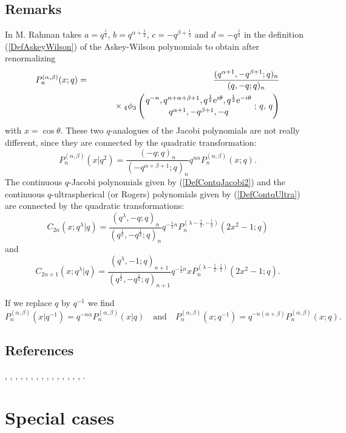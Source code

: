 \documentclass[envcountchap,graybox]{svmono}
\newcommand{\qhyp}[5]{\mbox{}_{#1}{\phi}_{#2}
\left(\genfrac{}{}{0pt}{}{#3}{#4}\,;\,q,\,#5\right)}
\newcommand{\mathindent}{\hspace{7.5mm}}
\newcommand{\e}{\textrm{e}}
\begin{document}
\subsection*{Remarks} 
In \cite{Rahman81IV} M. Rahman takes
$a=q^{\frac{1}{2}}$, $b=q^{\alpha+\frac{1}{2}}$, $c=-q^{\beta+\frac{1}{2}}$ and
$d=-q^{\frac{1}{2}}$ in the definition (\ref{DefAskeyWilson}) of the
Askey-Wilson polynomials to obtain after renormalizing
\begin{eqnarray}
\label{DefContqJacobi2}
P_n^{(\alpha,\beta)}(x;q)&=&\frac{(q^{\alpha+1},-q^{\beta+1};q)_n}{(q,-q;q)_n}\nonumber\\
& &{}\mathindent{}\times
\qhyp{4}{3}{q^{-n},q^{n+\alpha+\beta+1},q^{\frac{1}{2}}\e^{i\theta},q^{\frac{1}{2}}\e^{-i\theta}}
{q^{\alpha+1},-q^{\beta+1},-q}{q}
\end{eqnarray}
with $x=\cos\theta$. These two $q$-analogues of the Jacobi polynomials are not really
different, since they are connected by the quadratic transformation:
$$P_n^{(\alpha,\beta)}(x|q^2)=\frac{(-q;q)_n}{(-q^{\alpha+\beta+1};q)_n}q^{n\alpha}P_n^{(\alpha,\beta)}(x;q).$$
The continuous $q$-Jacobi polynomials given by (\ref{DefContqJacobi2}) and
the continuous $q$-ultra\-spher\-ical (or Rogers) polynomials given by
(\ref{DefContqUltra}) are connected by the quadratic transformations:
$$C_{2n}(x;q^{\lambda}|q)=\frac{(q^{\lambda},-q;q)_n}
{(q^{\frac{1}{2}},-q^{\frac{1}{2}};q)_n}q^{-\frac{1}{2}n}
P_n^{(\lambda-\frac{1}{2},-\frac{1}{2})}(2x^2-1;q)$$
and
$$C_{2n+1}(x;q^{\lambda}|q)=\frac{(q^{\lambda},-1;q)_{n+1}}
{(q^{\frac{1}{2}},-q^{\frac{1}{2}};q)_{n+1}}q^{-\frac{1}{2}n}
xP_n^{(\lambda-\frac{1}{2},\frac{1}{2})}(2x^2-1;q).$$

\noindent
If we replace $q$ by $q^{-1}$ we find
$$P_n^{(\alpha,\beta)}(x|q^{-1})=q^{-n\alpha}P_n^{(\alpha,\beta)}(x|q)\quad\textrm{and}\quad
P_n^{(\alpha,\beta)}(x;q^{-1})=q^{-n(\alpha+\beta)}P_n^{(\alpha,\beta)}(x;q).$$

\subsection*{References}
\cite{AskeyWilson85}, \cite{Floreanini+96}, \cite{GasperRahman86},
\cite{GasperRahman90}, \cite{IsmailMassonSuslov}, \cite{IsmailRahman91},
\cite{IsmailRahmanZhang}, \cite{Koorn2007}, \cite{NassrallahRahman}, \cite{Nikiforov+},
\cite{Rahman81IV}, \cite{Rahman85}, \cite{Rahman86I}, \cite{Rahman88},
\cite{Spiridonov97}, \cite{Szwarc}.


\section*{Special cases}
\end{document}
